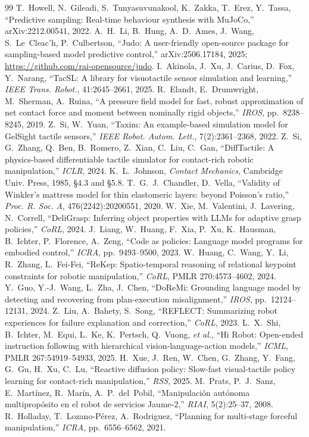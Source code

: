 \documentclass[10pt]{article}
\begin{document}
{\begin{thebibliography}{99}
 T.~Howell, N.~Gileadi, S.~Tunyasuvunakool, K.~Zakka, T.~Erez, Y.~Tassa, ``Predictive sampling: Real-time behaviour synthesis with MuJoCo,'' arXiv:2212.00541, 2022.
 A.~H.~Li, B.~Hung, A.~D.~Ames, J.~Wang, S.~Le~Cleac'h, P.~Culbertson, ``Judo: A user-friendly open-source package for sampling-based model predictive control,'' arXiv:2506.17184, 2025; \url{https://github.com/rai-opensource/judo}.
 I.~Akinola, J.~Xu, J.~Carius, D.~Fox, Y.~Narang, ``TacSL: A library for visuotactile sensor simulation and learning,'' \emph{IEEE Trans. Robot.}, 41:2645--2661, 2025.
 R.~Elandt, E.~Drumwright, M.~Sherman, A.~Ruina, ``A pressure field model for fast, robust approximation of net contact force and moment between nominally rigid objects,'' \emph{IROS}, pp.~8238--8245, 2019.
 Z.~Si, W.~Yuan, ``Taxim: An example-based simulation model for GelSight tactile sensors,'' \emph{IEEE Robot. Autom. Lett.}, 7(2):2361--2368, 2022.
 Z.~Si, G.~Zhang, Q.~Ben, B.~Romero, Z.~Xian, C.~Liu, C.~Gan, ``DiffTactile: A physics-based differentiable tactile simulator for contact-rich robotic manipulation,'' \emph{ICLR}, 2024.
 K.~L.~Johnson, \emph{Contact Mechanics}, Cambridge Univ. Press, 1985, \S4.3 and \S5.8.
 T.~G.~J.~Chandler, D.~Vella, ``Validity of Winkler's mattress model for thin elastomeric layers: beyond Poisson's ratio,'' \emph{Proc. R. Soc. A}, 476(2242):20200551, 2020.
 W.~Xie, M.~Valentini, J.~Lavering, N.~Correll, ``DeliGrasp: Inferring object properties with LLMs for adaptive grasp policies,'' \emph{CoRL}, 2024.
 J.~Liang, W.~Huang, F.~Xia, P.~Xu, K.~Hausman, B.~Ichter, P.~Florence, A.~Zeng, ``Code as policies: Language model programs for embodied control,'' \emph{ICRA}, pp.~9493--9500, 2023.
 W.~Huang, C.~Wang, Y.~Li, R.~Zhang, L.~Fei-Fei, ``ReKep: Spatio-temporal reasoning of relational keypoint constraints for robotic manipulation,'' \emph{CoRL}, PMLR 270:4573--4602, 2024.
 Y.~Guo, Y.-J.~Wang, L.~Zha, J.~Chen, ``DoReMi: Grounding language model by detecting and recovering from plan-execution misalignment,'' \emph{IROS}, pp.~12124--12131, 2024.
 Z.~Liu, A.~Bahety, S.~Song, ``REFLECT: Summarizing robot experiences for failure explanation and correction,'' \emph{CoRL}, 2023.
 L.~X.~Shi, B.~Ichter, M.~Equi, L.~Ke, K.~Pertsch, Q.~Vuong, \emph{et al.}, ``Hi Robot: Open-ended instruction following with hierarchical vision-language-action models,'' \emph{ICML}, PMLR 267:54919--54933, 2025.
 H.~Xue, J.~Ren, W.~Chen, G.~Zhang, Y.~Fang, G.~Gu, H.~Xu, C.~Lu, ``Reactive diffusion policy: Slow-fast visual-tactile policy learning for contact-rich manipulation,'' \emph{RSS}, 2025.
 M.~Prats, P.~J.~Sanz, E.~Mart\'inez, R.~Mar\'in, A.~P.~del~Pobil, ``Manipulaci\'on aut\'onoma multiprop\'osito en el robot de servicios Jaume-2,'' \emph{RIAI}, 5(2):25--37, 2008.
 R.~Holladay, T.~Lozano-P\'erez, A.~Rodriguez, ``Planning for multi-stage forceful manipulation,'' \emph{ICRA}, pp.~6556--6562, 2021.
\end{thebibliography}}
\end{document}
